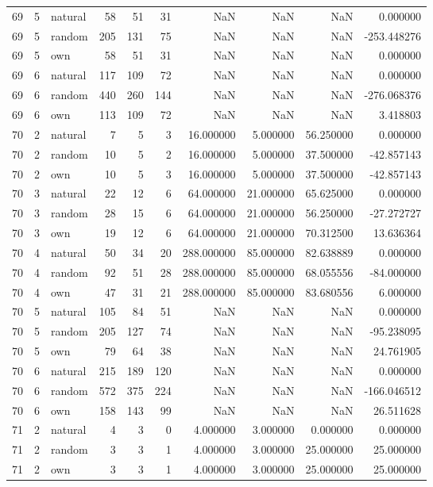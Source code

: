 \begin{table}[htbp]
\begin{tabular}{rrlrrrrrrr}
69 & 5 & natural & 58 & 51 & 31 & NaN & NaN & NaN & 0.000000 \\
69 & 5 & random & 205 & 131 & 75 & NaN & NaN & NaN & -253.448276 \\
69 & 5 & own & 58 & 51 & 31 & NaN & NaN & NaN & 0.000000 \\
69 & 6 & natural & 117 & 109 & 72 & NaN & NaN & NaN & 0.000000 \\
69 & 6 & random & 440 & 260 & 144 & NaN & NaN & NaN & -276.068376 \\
69 & 6 & own & 113 & 109 & 72 & NaN & NaN & NaN & 3.418803 \\
70 & 2 & natural & 7 & 5 & 3 & 16.000000 & 5.000000 & 56.250000 & 0.000000 \\
70 & 2 & random & 10 & 5 & 2 & 16.000000 & 5.000000 & 37.500000 & -42.857143 \\
70 & 2 & own & 10 & 5 & 3 & 16.000000 & 5.000000 & 37.500000 & -42.857143 \\
70 & 3 & natural & 22 & 12 & 6 & 64.000000 & 21.000000 & 65.625000 & 0.000000 \\
70 & 3 & random & 28 & 15 & 6 & 64.000000 & 21.000000 & 56.250000 & -27.272727 \\
70 & 3 & own & 19 & 12 & 6 & 64.000000 & 21.000000 & 70.312500 & 13.636364 \\
70 & 4 & natural & 50 & 34 & 20 & 288.000000 & 85.000000 & 82.638889 & 0.000000 \\
70 & 4 & random & 92 & 51 & 28 & 288.000000 & 85.000000 & 68.055556 & -84.000000 \\
70 & 4 & own & 47 & 31 & 21 & 288.000000 & 85.000000 & 83.680556 & 6.000000 \\
70 & 5 & natural & 105 & 84 & 51 & NaN & NaN & NaN & 0.000000 \\
70 & 5 & random & 205 & 127 & 74 & NaN & NaN & NaN & -95.238095 \\
70 & 5 & own & 79 & 64 & 38 & NaN & NaN & NaN & 24.761905 \\
70 & 6 & natural & 215 & 189 & 120 & NaN & NaN & NaN & 0.000000 \\
70 & 6 & random & 572 & 375 & 224 & NaN & NaN & NaN & -166.046512 \\
70 & 6 & own & 158 & 143 & 99 & NaN & NaN & NaN & 26.511628 \\
71 & 2 & natural & 4 & 3 & 0 & 4.000000 & 3.000000 & 0.000000 & 0.000000 \\
71 & 2 & random & 3 & 3 & 1 & 4.000000 & 3.000000 & 25.000000 & 25.000000 \\
71 & 2 & own & 3 & 3 & 1 & 4.000000 & 3.000000 & 25.000000 & 25.000000 \\

\end{tabular}
\end{table}
